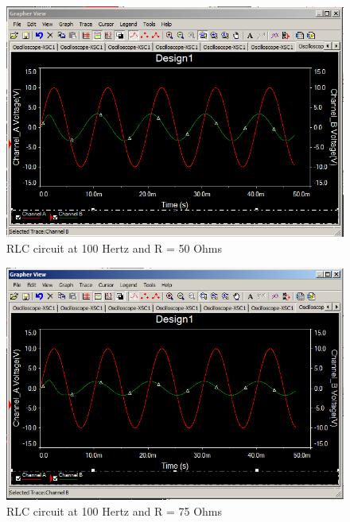 \documentclass[12pt]{article}
\begin{document}
\begin{figure}[h!] %
   \centering
   \includegraphics[width=5in]{100hz.PNG} 
   \caption{RLC circuit at 100 Hertz and R = 50 Ohms}
   \label{fig:example}
\end{figure}
\bigskip

\newpage

\begin{figure}[h!] %
   \centering
   \includegraphics[width=5in]{100hz_75r.PNG} 
   \caption{RLC circuit at 100 Hertz and R = 75 Ohms}
   \label{fig:example}
\end{figure}
\bigskip
\end{document}
